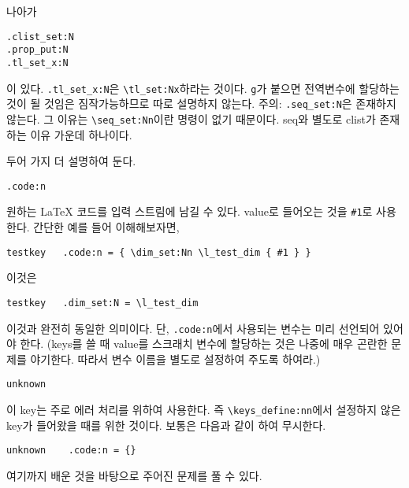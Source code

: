 \documentclass[a4paper,amsmath]{oblivoir}
\begin{document}
나아가
\begin{verbatim}
.clist_set:N
.prop_put:N
.tl_set_x:N
\end{verbatim}
이 있다. 
\verb|.tl_set_x:N|은 \verb|\tl_set:Nx|하라는 것이다.
\verb|g|가 붙으면 전역변수에 할당하는 것이 될 것임은 짐작가능하므로 따로 설명하지 않는다.
주의: \verb|.seq_set:N|은 존재하지 않는다. 그 이유는 \verb|\seq_set:Nn|이란 명령이 없기 때문이다.
seq와 별도로 clist가 존재하는 이유 가운데 하나이다.

두어 가지 더 설명하여 둔다.
\begin{verbatim}
.code:n
\end{verbatim}
원하는 \LaTeX{} 코드를 입력 스트림에 남길 수 있다. value로 들어오는 것을 \verb|#1|로 사용한다.
간단한 예를 들어 이해해보자면,
\begin{verbatim}
testkey   .code:n = { \dim_set:Nn \l_test_dim { #1 } }
\end{verbatim}
이것은
\begin{verbatim}
testkey   .dim_set:N = \l_test_dim
\end{verbatim}
이것과 완전히 동일한 의미이다. 단, \verb|.code:n|에서 사용되는 변수는 미리 선언되어 있어야 한다.
(\textsf{keys}를 쓸 때 value를 스크래치 변수에 할당하는 것은 나중에 매우 곤란한 문제를 야기한다.
따라서 변수 이름을 별도로 설정하여 주도록 하여라.)

\begin{verbatim}
unknown
\end{verbatim}
이 key는 주로 에러 처리를 위하여 사용한다. 즉 \verb|\keys_define:nn|에서 설정하지 않은 key가 들어왔을 때를 위한 것이다. 보통은 다음과 같이 하여 무시한다.

\begin{verbatim}
unknown    .code:n = {}
\end{verbatim}

\bigskip

여기까지 배운 것을 바탕으로 주어진 문제를 풀 수 있다.

\end{document}

